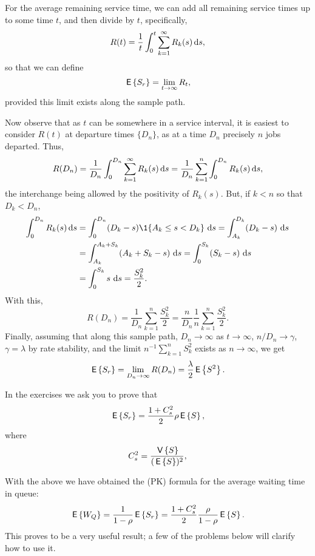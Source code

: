 For the average remaining service time, we can add all remaining
service times up to some time $t$, and then divide by $t$,
specifically,
\begin{equation*}
R(t) = \frac{1}t \int_0^t \sum_{k=1}^\infty R_k(s) \,\text{d}s,
\end{equation*}
so that we can define
\begin{equation*}
  \,\mathsf{E}\left\{S_r\right\} = \lim_{t\to\infty} R_t,
\end{equation*}
provided this limit exists along the sample path.

Now observe that as $t$ can be somewhere in a service interval, it is
easiest to consider $R(t)$ at departure times $\{D_n\}$, as at a time
$D_n$ precisely $n$ jobs departed. Thus,
\begin{align*}
R(D_n)
= \frac{1}{D_n} \int_0^{D_n} \sum_{k=1}^\infty R_k(s) \,\text{d}s 
= \frac{1}{D_n} \sum_{k=1}^n \int_0^{D_n}  R_k(s) \,\text{d}s,
\end{align*}
the interchange being allowed by the positivity of $R_k(s)$.  But, if
$k<n$ so that $D_k< D_n$, 
\begin{align*}
\int_0^{D_n} R_k(s) \d s
&= \int_0^{D_n} (D_k-s)\1{A_k \leq s < D_k}\, \d s = \int_{A_k}^{D_k} (D_k-s) \, \d s \\
&= \int_{A_k}^{A_k+S_k} (A_k+S_k-s) \, \d s  = \int_{0}^{S_k} (S_k-s) \, \d s \\
&= \int_{0}^{S_k} s \, \d s = \frac{S_k^2}2.
\end{align*}
With this, 
\begin{equation*}
R(D_n)
= \frac{1}{D_n} \sum_{k=1}^n \frac{S_k^2}2 = \frac{n}{D_n} \frac 1 n\sum_{k=1}^n \frac{S_k^2}2.
\end{equation*}
Finally, assuming that along this sample path, $D_n\to \infty$ as
$t\to \infty$, $n/D_n \to \gamma$, $\gamma=\lambda$ by rate stability,
and the limit $n^{-1}\sum_{k=1}^n S_k^2$ exists as $n\to\infty$, we
get
\begin{equation}\label{eq:34}
\,\mathsf{E}\left\{S_r\right\} = \lim_{D_n\to\infty} R(D_n) = \frac{\lambda}2 \,\mathsf{E}\left\{S^2\right\}.
\end{equation}

In the exercises we ask you to prove that
\begin{equation}\label{eq:32}
  \,\mathsf{E}\left\{S_r\right\} = \frac{1+C_s^2}2\rho\,\mathsf{E}\left\{S\right\},
\end{equation}
where
\begin{equation*}
 C_s^2 = \frac{\,\mathsf{V}\left\{S\right\} }{(\,\mathsf{E}\left\{S\right\})^2},
\end{equation*}

With the above we have obtained the 
(PK) formula for the average waiting time in queue:
\begin{equation} \label{eq:710}
  \,\mathsf{E}\left\{W_Q\right\} = \frac1{1-\rho} \,\mathsf{E}\left\{S_r\right\} =\frac{1 + C_s^2}2 \frac{\rho}{1-\rho}  \,\mathsf{E}\left\{S\right\}.
\end{equation}
This proves to be a very useful result; a few of the problems below
will clarify how to use it.

